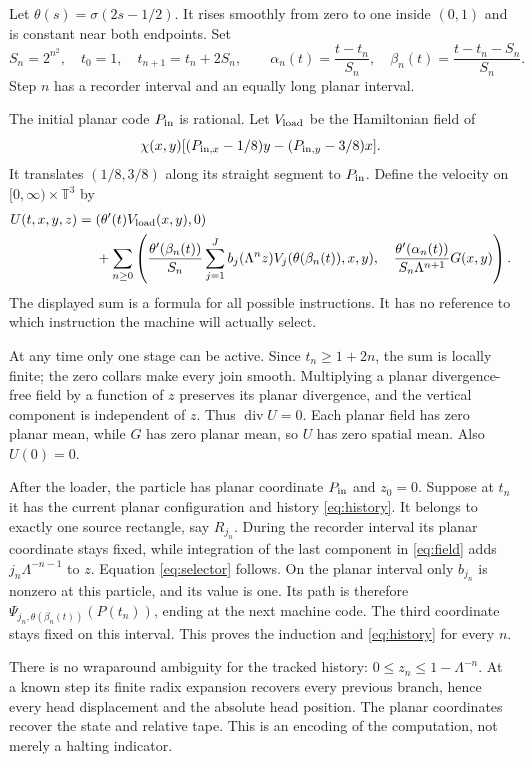\documentclass[11pt]{article}
\newcommand{\T}{\mathbb T}
\DeclareMathOperator{\diver}{div}
\begin{document}
Let $\theta(s)=\sigma(2s-1/2)$. It rises smoothly from zero to one
inside $(0,1)$ and is constant near both endpoints. Set
\[
 S_n=2^{n^2},\quad t_0=1,\quad t_{n+1}=t_n+2S_n,
 \qquad
 \alpha_n(t)=\frac{t-t_n}{S_n},\quad
 \beta_n(t)=\frac{t-t_n-S_n}{S_n}.
\]
Step $n$ has a recorder interval and an equally long planar interval.

The initial planar code $P_{\rm in}$ is rational. Let $V_{\rm load}$
be the Hamiltonian field of
\[
 \chi(x,y)[(P_{{\rm in},x}-1/8)y-(P_{{\rm in},y}-3/8)x].
\]
It translates $(1/8,3/8)$ along its straight segment to $P_{\rm in}$.
Define the velocity on $[0,\infty)\times\T^3$ by
\begin{equation}\label{eq:field}
\begin{split}
 U(t,x,y,z)={}&(\theta'(t)V_{\rm load}(x,y),0)\\
 &+\sum_{n\geq0}\left(
 \frac{\theta'(\beta_n(t))}{S_n}
 \sum_{j=1}^J b_j(\Lambda^n z)
 V_j(\theta(\beta_n(t)),x,y),\quad
 \frac{\theta'(\alpha_n(t))}{S_n\Lambda^{n+1}}G(x,y)
 \right).
\end{split}
\end{equation}
The displayed sum is a formula for all possible instructions. It has no
reference to which instruction the machine will actually select.

At any time only one stage can be active. Since $t_n\geq1+2n$, the sum
is locally finite; the zero collars make every join smooth. Multiplying
a planar divergence-free field by a function of $z$ preserves its planar
divergence, and the vertical component is independent of $z$. Thus
$\diver U=0$. Each planar field has zero planar mean, while $G$ has
zero planar mean, so $U$ has zero spatial mean. Also $U(0)=0$.

After the loader, the particle has planar coordinate $P_{\rm in}$ and
$z_0=0$. Suppose at $t_n$ it has the current planar configuration and
history \eqref{eq:history}. It belongs to exactly one source rectangle,
say $R_{j_n}$. During the recorder interval its planar coordinate stays
fixed, while integration of the last component in \eqref{eq:field}
adds $j_n\Lambda^{-n-1}$ to $z$. Equation \eqref{eq:selector} follows.
On the planar interval only $b_{j_n}$ is nonzero at this particle, and
its value is one. Its path is therefore
$\Psi_{j_n,\theta(\beta_n(t))}(P(t_n))$, ending at the next machine code.
The third coordinate stays fixed on this interval. This proves the
induction and \eqref{eq:history} for every $n$.

There is no wraparound ambiguity for the tracked history:
$0\leq z_n\leq1-\Lambda^{-n}$. At a known step its finite radix
expansion recovers every previous branch, hence every head displacement
and the absolute head position. The planar coordinates recover the
state and relative tape. This is an encoding of the computation, not
merely a halting indicator.
\end{document}
